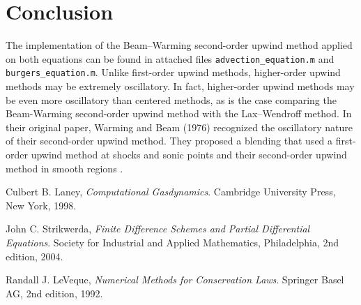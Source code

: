 \documentclass[a4paper, 10pt]{article}
\begin{document}
\section{Conclusion}
The implementation of the Beam--Warming second-order upwind method applied on both equations can be found in attached files \texttt{advection\_equation.m} and \texttt{burgers\_equation.m}. Unlike first-order upwind methods, higher-order upwind methods may be extremely oscillatory. In fact, higher-order upwind methods may be even more oscillatory than centered methods, as is the case comparing the Beam-Warming second-order upwind method with the Lax--Wendroff method. In their original paper, Warming and Beam (1976) recognized the oscillatory nature of their second-order upwind method. They proposed a blending that used a first-order upwind method at shocks and sonic points and their second-order upwind method in smooth regions \cite{laney}.


\begin{thebibliography}{5}

  Culbert B. Laney,
  \emph{Computational Gasdynamics}.
  Cambridge University Press, New York,
  1998.
  
  John C. Strikwerda,
  \emph{Finite Difference Schemes and Partial Differential Equations}.
  Society for Industrial and Applied Mathematics, Philadelphia,
  2nd edition,
  2004.
  
  Randall J. LeVeque,
  \emph{Numerical Methods for Conservation Laws}.
  Springer Basel AG,
  2nd edition,
  1992.

\end{thebibliography}
\end{document}
